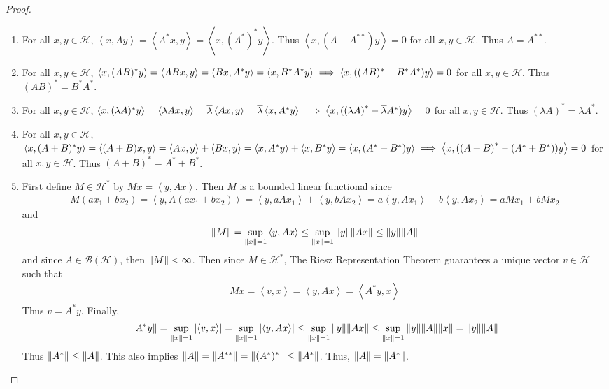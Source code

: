 \documentclass{article} %
\theoremstyle{plain}
\newcommand{\VEC}[2]{\left\langle #1, #2 \right\rangle}
\newcommand{\Hilb}{\mathcal{H}}
\numberwithin{equation}{section} %
\numberwithin{figure}{section} %
\numberwithin{table}{section} %
\begin{document}
\begin{proof}
    \begin{enumerate}[\it (a)]
        \item For all $x,y \in \Hilb$, $\VEC{x}{Ay} = \VEC{A^*x}{y} = \VEC{x}{(A^{*})^*y}$.  Thus $\VEC{x}{(A - A^{**})y} = 0$ for all $x, y \in \Hilb$.  Thus $A = A^{**}$.
        \item For all $x,y \in \Hilb$, $\VEC{x}{(AB)^*y} = \VEC{ABx}{y} = \VEC{Bx}{A^*y} = \VEC{x}{B^*A^*y} \implies \VEC{x}{\qty((AB)^* - B^*A^*)y} = 0$ for all $x, y \in \Hilb$.  Thus $(AB)^* = B^*A^*$.
        \item For all $x,y \in \Hilb$, $\VEC{x}{(\lambda A)^*y} = \VEC{\lambda Ax}{y} = \overline{\lambda}\VEC{Ax}{y} = \overline{\lambda}\VEC{x}{A^*y} \implies \VEC{x}{(\qty(\lambda A)^* - \overline{\lambda} A^*)y} = 0$ for all $x, y \in \Hilb$.  Thus $(\lambda A)^* = \overline{\lambda}A^*$.
        \item For all $x,y \in \Hilb$, $\VEC{x}{(A + B)^*y} = \VEC{(A + B)x}{y} = \VEC{Ax}{y} + \VEC{Bx}{y} = \VEC{x}{A^*y} + \VEC{x}{B^*y} = \VEC{x}{(A^* + B^*)y} \implies \VEC{x}{(\qty(A + B)^* - (A^* + B^*))y} = 0$ for all $x, y \in \Hilb$.  Thus $(A + B)^* = A^* + B^*$.
        \item First define $M \in \Hilb^*$ by $Mx = \VEC{y}{Ax}$.  Then $M$ is a bounded linear functional since
        \begin{align*}
            M(ax_1 + bx_2) = \VEC{y}{A(ax_1 + bx_2)} = \VEC{y}{aAx_1} + \VEC{y}{bAx_2} = a\VEC{y}{Ax_1} + b\VEC{y}{Ax_2} = aMx_1 + bMx_2
        \end{align*}
        and
        \begin{align*}
            \norm{M} = \sup_{\norm{x} = 1}\VEC{y}{Ax} \leq \sup_{\norm{x} = 1}\norm{y}\norm{Ax} \leq \norm{y}\norm{A}
        \end{align*}
        and since $A \in \mathcal{B}(\Hilb)$, then $\norm{M} < \infty$.  Then since $M \in \Hilb^*$, The Riesz Representation Theorem guarantees a unique vector $v \in \Hilb$ such that
        \begin{align*}
            Mx = \VEC{v}{x} = \VEC{y}{Ax} = \VEC{A^*y}{x}
        \end{align*}
        Thus $v = A^*y$.  Finally,
        \begin{align*}
            \norm{A^*y} = \sup_{\norm{x}=1}\left|\VEC{v}{x}\right| = \sup_{\norm{x}=1}\left|\VEC{y}{Ax}\right| \leq \sup_{\norm{x}=1}\norm{y}{\norm{Ax}} \leq \sup_{\norm{x}=1}\norm{y}\norm{A}\norm{x} = \norm{y}\norm{A}
        \end{align*}
        Thus $\norm{A^*} \leq \norm{A}$.  This also implies $\norm{A} = \norm{A^{**}} = \norm{(A^*)^*} \leq \norm{A^*}$.  Thus, $\norm{A} = \norm{A^*}$.
    \end{enumerate}
\end{proof}
\end{document}
